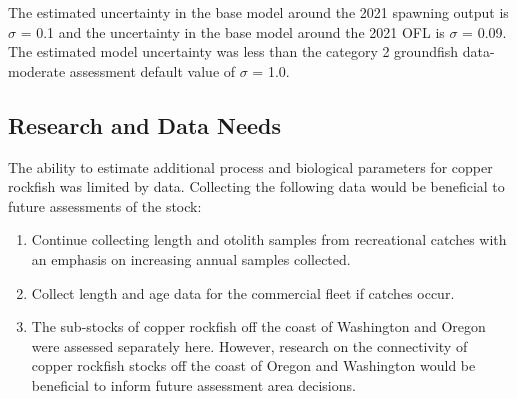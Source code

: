 \documentclass[11pt,
  english,
  a4paper,
]{article}
\begin{document}
\leavevmode\tagmcend\tagstructend


The estimated uncertainty in the base model around the 2021 spawning output is {\(\sigma\)\leavevmode\tagmcend\tagstructend} = 0.1 and the uncertainty in the base model around the 2021 OFL is {\(\sigma\)\leavevmode\tagmcend\tagstructend} = 0.09. The estimated model uncertainty was less than the category 2 groundfish data-moderate assessment default value of {\(\sigma\)\leavevmode\tagmcend\tagstructend} = 1.0.

\leavevmode\tagmcend\tagstructend\par


\hypertarget{research-and-data-needs}{%
\subsection{Research and Data Needs}\label{research-and-data-needs}}

\leavevmode\tagmcend\tagstructend


The ability to estimate additional process and biological parameters for copper rockfish was limited by data. Collecting the following data would be beneficial to future assessments of the stock:

\leavevmode\tagmcend\tagstructend\par

\begin{enumerate}

    \item Continue collecting length and otolith samples from recreational catches with an emphasis on increasing annual samples collected.

    \item Collect length and age data for the commercial fleet if catches occur.

    \item The sub-stocks of copper rockfish off the coast of Washington and Oregon were assessed separately here. However, research on the connectivity of copper rockfish stocks off the coast of Oregon and Washington would be beneficial to inform future assessment area decisions. 

\end{enumerate}
\end{document}
